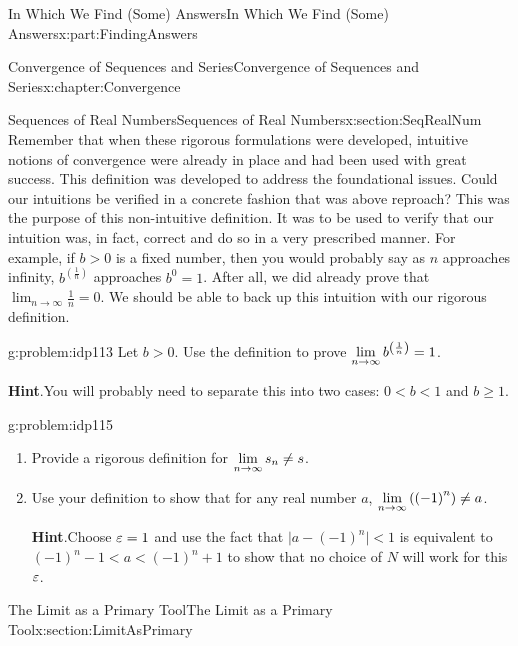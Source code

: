 \begin{partptx}{In Which We Find (Some) Answers}{}{In Which We Find (Some) Answers}{}{}{x:part:FindingAnswers}
\begin{chapterptx}{Convergence of Sequences and Series}{}{Convergence of Sequences and Series}{}{}{x:chapter:Convergence}
\begin{sectionptx}{Sequences of Real Numbers}{}{Sequences of Real Numbers}{}{}{x:section:SeqRealNum}
			Remember that when these rigorous formulations were developed, intuitive notions of convergence were already in place and had been used with great success. This definition was developed to address the foundational issues. Could our intuitions be verified in a concrete fashion that was above reproach? This was the purpose of this non-intuitive definition. It was to be used to verify that our intuition was, in fact, correct and do so in a very prescribed manner. For example, if \(b>0\) is a fixed number, then you would probably say as \(n\) approaches infinity, \(b^{\left(\frac{1}{n}\right)}\) approaches \(b^0=1\). After all, we did already prove that \(\lim_{n\rightarrow\infty}\frac{1}{n}=0\). We should be able to back up this intuition with our rigorous definition.%
			\begin{problem}{}{g:problem:idp113}%
				 Let \(b>0\). Use the definition to prove \({\displaystyle\lim_{n\rightarrow \infty}b^{\left(\frac{1}{n}\right)}}=1\).%
				\par\smallskip%
				\noindent\textbf{\blocktitlefont Hint}.\hypertarget{g:hint:idp114}{}\quad{}You will probably need to separate this into two cases: \(0\lt b\lt 1\) and \(b\geq 1\).%
			\end{problem}
			\begin{problem}{}{g:problem:idp115}%
				\begin{enumerate}[font=\bfseries,label=(\alph*),ref=\alph*]
					\item{}Provide a rigorous definition for \({\displaystyle\lim_{n\rightarrow \infty}s_n}\neq s\).%
					\item{}Use your definition to show that for any real number \(a\), \({\displaystyle\lim_{n\rightarrow \infty}\left(\left(-1\right)^n\right)}\neq a\).%
					\par\smallskip%
					\noindent\textbf{\blocktitlefont Hint}.\hypertarget{g:hint:idp116}{}\quad{}Choose \(\varepsilon=1\) and use the fact that \(\Big|a-(-1)^n\Big|\lt 1\) is equivalent to \(\left(-1\right)^n-1\lt a\lt \left(-1\right)^n+1\) to show that no choice of \(N\) will work for this \(\varepsilon\).%
				\end{enumerate}
			\end{problem}
		\end{sectionptx}
		\typeout{************************************************}
		\typeout{************************************************}
		\begin{sectionptx}{The Limit as a Primary Tool}{}{The Limit as a Primary Tool}{}{}{x:section:LimitAsPrimary}

\end{sectionptx}
\end{chapterptx}
\end{partptx}
